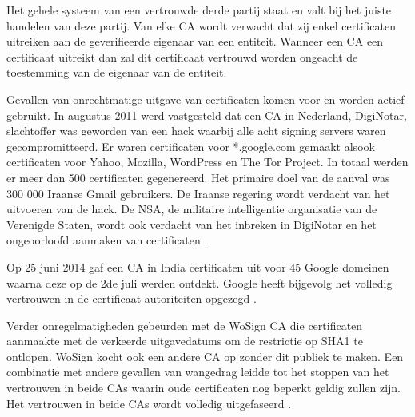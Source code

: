 Het gehele systeem van een vertrouwde derde partij staat en valt bij het juiste
handelen van deze partij. Van elke CA wordt verwacht dat zij enkel certificaten
uitreiken aan de geverifieerde eigenaar van een entiteit. Wanneer een CA een
certificaat uitreikt dan zal dit certificaat vertrouwd worden ongeacht de
toestemming van de eigenaar van de entiteit.

Gevallen van onrechtmatige uitgave van certificaten komen voor en worden actief
gebruikt. In augustus 2011 werd vastgesteld dat een CA in Nederland, DigiNotar,
slachtoffer was geworden van een hack waarbij alle acht signing servers waren
gecompromitteerd. Er waren certificaten voor *.google.com gemaakt alsook
certificaten voor Yahoo, Mozilla, WordPress en The Tor Project. In totaal werden
er meer dan 500 certificaten gegenereerd. Het primaire doel van de aanval was
300 000 Iraanse Gmail gebruikers. De Iraanse regering wordt verdacht van het
uitvoeren van de hack. De NSA, de militaire intelligentie organisatie van de
Verenigde Staten, wordt ook verdacht van het inbreken in DigiNotar en het
ongeoorloofd aanmaken van certificaten \autocite{DiginotarNu,
	DigiNotarThreatpost, DigiNotarComputerworld, DigiNotarSchneier,
	DigiNotarTweakers}.

Op 25 juni 2014 gaf een CA in India certificaten uit voor 45 Google domeinen
waarna deze op de 2de juli werden ontdekt. Google heeft bijgevolg het volledig
vertrouwen in de certificaat autoriteiten opgezegd \autocite{Wilson2014}.

Verder onregelmatigheden gebeurden met de WoSign CA die certificaten aanmaakte
met de verkeerde uitgavedatums om de restrictie op SHA1 te ontlopen. WoSign
kocht ook een andere CA op zonder dit publiek te maken. Een combinatie met
andere gevallen van wangedrag leidde tot het stoppen van het vertrouwen in beide
CAs waarin oude certificaten nog beperkt geldig zullen zijn. Het vertrouwen in
beide CAs wordt volledig uitgefaseerd  \autocite{WoSignMozilla, WoSignTweakers1,
	WoSignTweakers2}.
